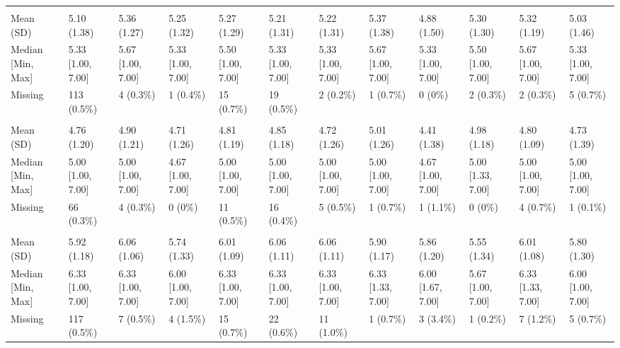 \documentclass[
  single column]{article}
\begin{document}
\begin{landscape}
\begin{tabular}[t]{llllllllllll}
\addlinespace[0.3em]
\multicolumn{12}{l}{\textbf{self\_esteem}}\\
\hspace{1em}Mean (SD) & 5.10 (1.38) & 5.36 (1.27) & 5.25 (1.32) & 5.27 (1.29) & 5.21 (1.31) & 5.22 (1.31) & 5.37 (1.38) & 4.88 (1.50) & 5.30 (1.30) & 5.32 (1.19) & 5.03 (1.46)\\
\hspace{1em}Median [Min, Max] & 5.33 [1.00, 7.00] & 5.67 [1.00, 7.00] & 5.33 [1.00, 7.00] & 5.50 [1.00, 7.00] & 5.33 [1.00, 7.00] & 5.33 [1.00, 7.00] & 5.67 [1.00, 7.00] & 5.33 [1.00, 7.00] & 5.50 [1.00, 7.00] & 5.67 [1.00, 7.00] & 5.33 [1.00, 7.00]\\
\hspace{1em}Missing & 113 (0.5\%) & 4 (0.3\%) & 1 (0.4\%) & 15 (0.7\%) & 19 (0.5\%) & 2 (0.2\%) & 1 (0.7\%) & 0 (0\%) & 2 (0.3\%) & 2 (0.3\%) & 5 (0.7\%)\\
\addlinespace[0.3em]
\multicolumn{12}{l}{\textbf{Short Form Health}}\\
\hspace{1em}Mean (SD) & 4.76 (1.20) & 4.90 (1.21) & 4.71 (1.26) & 4.81 (1.19) & 4.85 (1.18) & 4.72 (1.26) & 5.01 (1.26) & 4.41 (1.38) & 4.98 (1.18) & 4.80 (1.09) & 4.73 (1.39)\\
\hspace{1em}Median [Min, Max] & 5.00 [1.00, 7.00] & 5.00 [1.00, 7.00] & 4.67 [1.00, 7.00] & 5.00 [1.00, 7.00] & 5.00 [1.00, 7.00] & 5.00 [1.00, 7.00] & 5.00 [1.00, 7.00] & 4.67 [1.00, 7.00] & 5.00 [1.33, 7.00] & 5.00 [1.00, 7.00] & 5.00 [1.00, 7.00]\\
\hspace{1em}Missing & 66 (0.3\%) & 4 (0.3\%) & 0 (0\%) & 11 (0.5\%) & 16 (0.4\%) & 5 (0.5\%) & 1 (0.7\%) & 1 (1.1\%) & 0 (0\%) & 4 (0.7\%) & 1 (0.1\%)\\
\addlinespace[0.3em]
\multicolumn{12}{l}{\textbf{Support}}\\
\hspace{1em}Mean (SD) & 5.92 (1.18) & 6.06 (1.06) & 5.74 (1.33) & 6.01 (1.09) & 6.06 (1.11) & 6.06 (1.11) & 5.90 (1.17) & 5.86 (1.20) & 5.55 (1.34) & 6.01 (1.08) & 5.80 (1.30)\\
\hspace{1em}Median [Min, Max] & 6.33 [1.00, 7.00] & 6.33 [1.00, 7.00] & 6.00 [1.00, 7.00] & 6.33 [1.00, 7.00] & 6.33 [1.00, 7.00] & 6.33 [1.00, 7.00] & 6.33 [1.33, 7.00] & 6.00 [1.67, 7.00] & 5.67 [1.00, 7.00] & 6.33 [1.33, 7.00] & 6.00 [1.00, 7.00]\\
\hspace{1em}Missing & 117 (0.5\%) & 7 (0.5\%) & 4 (1.5\%) & 15 (0.7\%) & 22 (0.6\%) & 11 (1.0\%) & 1 (0.7\%) & 3 (3.4\%) & 1 (0.2\%) & 7 (1.2\%) & 5 (0.7\%)\\
\bottomrule
\end{tabular}


\end{landscape}
\end{document}
